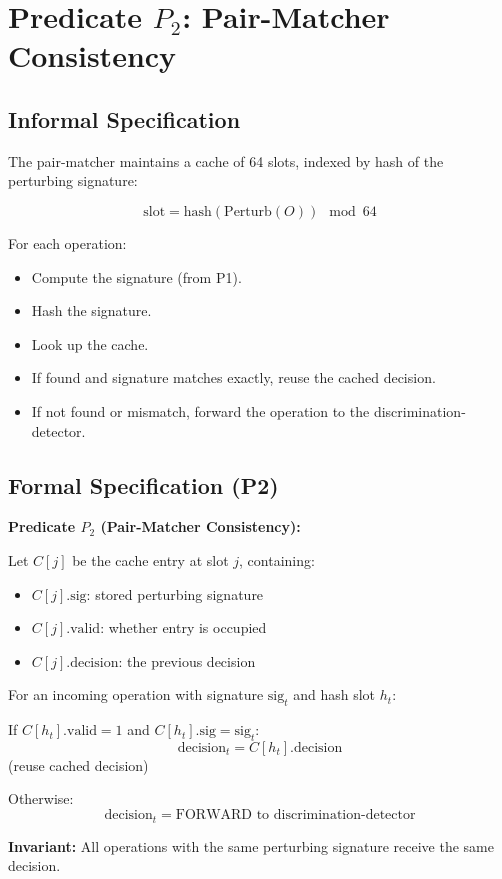 \documentclass[11pt,oneside]{article}
\begin{document}
\section{Predicate $P_2$: Pair-Matcher Consistency}

\subsection{Informal Specification}

The pair-matcher maintains a cache of 64 slots, indexed by hash of the perturbing signature:

\[
\text{slot} = \text{hash}(\text{Perturb}(O)) \mod 64
\]

For each operation:
\begin{itemize}
\item Compute the signature (from P1).
\item Hash the signature.
\item Look up the cache.
\item If found and signature matches exactly, reuse the cached decision.
\item If not found or mismatch, forward the operation to the discrimination-detector.
\end{itemize}

\subsection{Formal Specification (P2)}

\begin{boxed}
\textbf{Predicate $P_2$ (Pair-Matcher Consistency):}

Let $C[j]$ be the cache entry at slot $j$, containing:
\begin{itemize}
\item $C[j].\text{sig}$: stored perturbing signature
\item $C[j].\text{valid}$: whether entry is occupied
\item $C[j].\text{decision}$: the previous decision
\end{itemize}

For an incoming operation with signature $\text{sig}_t$ and hash slot $h_t$:

If $C[h_t].\text{valid} = 1$ and $C[h_t].\text{sig} = \text{sig}_t$:
\[
\text{decision}_t = C[h_t].\text{decision}
\]
(reuse cached decision)

Otherwise:
\[
\text{decision}_t = \text{FORWARD to discrimination-detector}
\]

\textbf{Invariant:} All operations with the same perturbing signature receive the same decision.
\end{boxed}
\end{document}
